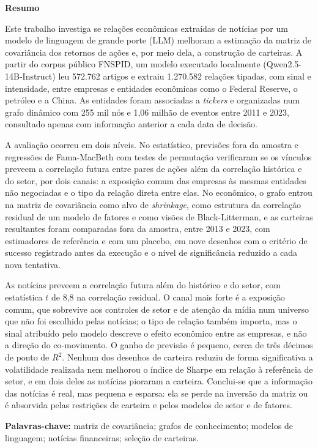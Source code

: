 
\begin{center}
\huge{{\bf Resumo}}
\vspace{2cm}
\end{center}

Este trabalho investiga se relações econômicas extraídas de notícias por um modelo de linguagem de grande porte (LLM) melhoram a estimação da matriz de covariância dos retornos de ações e, por meio dela, a construção de carteiras. A partir do corpus público FNSPID, um modelo executado localmente (Qwen2.5-14B-Instruct) leu 572.762 artigos e extraiu 1.270.582 relações tipadas, com sinal e intensidade, entre empresas e entidades econômicas como o Federal Reserve, o petróleo e a China. As entidades foram associadas a \textit{tickers} e organizadas num grafo dinâmico com 255 mil nós e 1,06 milhão de eventos entre 2011 e 2023, consultado apenas com informação anterior a cada data de decisão.

A avaliação ocorreu em dois níveis. No estatístico, previsões fora da amostra e regressões de Fama-MacBeth com testes de permutação verificaram se os vínculos preveem a correlação futura entre pares de ações além da correlação histórica e do setor, por dois canais: a exposição comum das empresas às mesmas entidades não negociadas e o tipo da relação direta entre elas. No econômico, o grafo entrou na matriz de covariância como alvo de \textit{shrinkage}, como estrutura da correlação residual de um modelo de fatores e como visões de Black-Litterman, e as carteiras resultantes foram comparadas fora da amostra, entre 2013 e 2023, com estimadores de referência e com um placebo, em nove desenhos com o critério de sucesso registrado antes da execução e o nível de significância reduzido a cada nova tentativa.

As notícias preveem a correlação futura além do histórico e do setor, com estatística $t$ de 8,8 na correlação residual. O canal mais forte é a exposição comum, que sobrevive aos controles de setor e de atenção da mídia num universo que não foi escolhido pelas notícias; o tipo de relação também importa, mas o sinal atribuído pelo modelo descreve o efeito econômico entre as empresas, e não a direção do co-movimento. O ganho de previsão é pequeno, cerca de três décimos de ponto de $R^2$. Nenhum dos desenhos de carteira reduziu de forma significativa a volatilidade realizada nem melhorou o índice de Sharpe em relação à referência de setor, e em dois deles as notícias pioraram a carteira. Conclui-se que a informação das notícias é real, mas pequena e esparsa: ela se perde na inversão da matriz ou é absorvida pelas restrições de carteira e pelos modelos de setor e de fatores.

\vspace{1cm}
\noindent\textbf{Palavras-chave:} matriz de covariância; grafos de conhecimento; modelos de linguagem; notícias financeiras; seleção de carteiras.

\clearpage
\thispagestyle{empty}
\cleardoublepage
